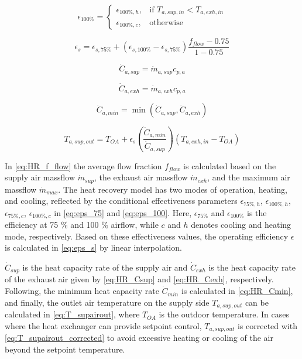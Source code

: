 \begin{equation}
    \epsilon_{100\%} = \begin{cases}
        \epsilon_{100\%,h},& \text{if } T_{a,sup,in}<T_{a,exh,in}\\
        \epsilon_{100\%,c},              & \text{otherwise}
    \end{cases}
    \label{eq:eps_100}
\end{equation}

\begin{equation}
    \epsilon_s = \epsilon_{s,75\%} + \left( \epsilon_{s,100\%} - \epsilon_{s,75\%} \right) \frac{f_{flow} - 0.75}{1 - 0.75} 
    \label{eq:eps_s}
\end{equation}

\begin{equation}
    \dot{C}_{a,sup} = \dot{m}_{a,sup} c_{p,a}
    \label{eq:HR_Csup}
\end{equation}


\begin{equation}
    \dot{C}_{a,exh} = \dot{m}_{a,exh} c_{p,a}
    \label{eq:HR_Cexh}
\end{equation}

\begin{equation}
    \dot{C}_{a,min} = \min \left( \dot{C}_{a,sup}, \dot{C}_{a,exh} \right)
    \label{eq:HR_Cmin}
\end{equation}


\begin{equation}
    T_{a,sup,out} = T_{OA} + \epsilon_{s} \left( \frac{\dot{C}_{a,min}}{\dot{C}_{a,sup}} \right) \left( T_{a,exh,in} - T_{OA} \right)
    \label{eq:T_supairout}
\end{equation}

In \autoref{eq:HR_f_flow} the average flow fraction $f_{flow}$ is calculated based on the supply air massflow $\dot{m}_{sup}$, the exhaust air massflow $\dot{m}_{exh}$, and the maximum air massflow $\dot{m}_{max}$. 
The heat recovery model has two modes of operation, heating, and cooling, reflected by the conditional effectiveness parameters $\epsilon_{75\%,h}$, $\epsilon_{100\%,h}$,$\epsilon_{75\%,c}$, $\epsilon_{100\%,c}$ in \autoref{eq:eps_75} and \autoref{eq:eps_100}. Here, $\epsilon_{75\%}$ and $\epsilon_{100\%}$ is the efficiency at 75 \% and 100 \% airflow, while $c$ and $h$ denotes cooling and heating mode, respectively. Based on these effectiveness values, the operating efficiency $\epsilon$ is calculated in \autoref{eq:eps_s} by linear interpolation.

$\dot{C}_{sup}$ is the heat capacity rate of the supply air and $\dot{C}_{exh}$ is the heat capacity rate of the exhaust air given by \autoref{eq:HR_Csup} and \autoref{eq:HR_Cexh}, respectively. Following, the minimum heat capacity rate $\dot{C}_{min}$ is calculated in \autoref{eq:HR_Cmin}, and finally, the outlet air temperature on the supply side $T_{a,sup,out}$ can be calculated in \autoref{eq:T_supairout}, where $T_{OA}$ is the outdoor temperature. In cases where the heat exchanger can provide setpoint control, $T_{a,sup,out}$ is corrected with \autoref{eq:T_supairout_corrected} to avoid excessive heating or cooling of the air beyond the setpoint temperature.

